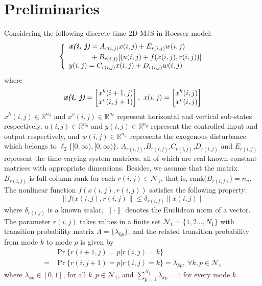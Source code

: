 \documentclass[journal,final,twocolumn]{IEEEtran}
\begin{document}
\section{Preliminaries} \label{priliminaries}
	Considering the following discrete-time 2D-MJS in Roesser model:
	\begin{equation} \label{system-equation}
	\left\{
		\begin{array}{lr}
			\begin{split}
				\emph{\textbf{x(i, j)}} &= A_{r(i,j)}x(i,j)+E_{r(i,j)}w(i,j)\\
										&+B_{r(i,j)}[(u(i,j)+f(x(i,j),r(i,j))]
			\end{split}\\
			\begin{split}
				y(i,j) = C_{r(i,j)}x(i,j)+D_{r(i,j)}w(i,j)
			\end{split}
		\end{array}
	\right.
	\end{equation}
	where
	\begin{equation*}
		\emph{\textbf{x(i, j)}} = \begin{bmatrix}
			x^{h}(i+1,j)\\
			x^{v}(i,j+1)
		\end{bmatrix}, \ 
		x(i, j) = \begin{bmatrix}
		x^{h}(i,j)\\
		x^{v}(i,j)
		\end{bmatrix}          
	\end{equation*}
	$x^{h}(i,j)\in \mathbb{R}^{n_h}$ and $x^{v}(i,j)\in \mathbb{R}^{n_v}$ represent horizontal and vertical sub-states respectively, $u(i,j) \in \mathbb{R}^{n_u}$ and $y(i,j) \in \mathbb{R}^{n_y}$ represent the controlled input and output respectively, and $w(i,j) \in \mathbb{R}^{n_w}$ represents the exogenous disturbance which belongs to $\ell_{2}\{[0,\infty),[0,\infty)\}$. $A_{r(i,j)}$,$B_{r(i,j)}$,$C_{r(i,j)}$,$D_{r(i,j)}$ and $E_{r(i,j)}$ represent the time-varying system matrices, all of which are real known constant matrices with appropriate dimensions. Besides, we assume that the matrix $B_{r(i,j)}$ is full column rank for each $r(i,j)\in\mathcal{N}_{1}$, that is, rank($B_{r(i,j)}$)$=n_u$. The nonlinear function $f(x(i,j),r(i,j))$ satisfies the following property:
	\begin{equation}\label{nonlinear-func}
		\|f(x(i,j),r(i,j)\| \leq \delta_{r(i,j)}\|x(i,j)\|
	\end{equation}
	where $\delta_{r(i,j)}$ is a known scalar, $\|\cdot\|$ denotes the Euclidean norm of a vector. The parameter $r(i,j)$ takes values in a finite set $\mathcal{N}_{1}=\{1,2...,N_{1} \}$ with transition probability matrix $\varLambda = \{\lambda_{kp}\}$, and the related transition probability from mode $k$ to mode $p$ is given by 
	\begin{equation}
		\begin{split}
			&\Pr\{r(i+1,j)=p|r(i,j)=k\}\\
		    =&\Pr\{r(i,j+1)=p|r(i,j)=k\}=\lambda_{kp},\  \forall k,p \in \mathcal{N}_{1}
		\end{split}
	\end{equation}
	where $\lambda_{kp}\in[0,1]$, for all $k, p\in\mathcal{N}_{1}$, and $\sum_{p=1}^{N_1}\lambda_{kp}=1$ for every mode $k$.
	
\end{document}
